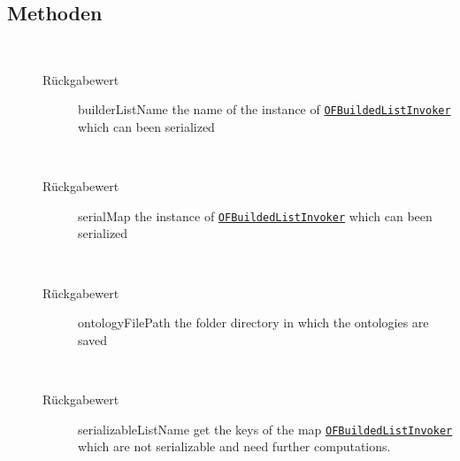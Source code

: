 \subsection{Methoden}
\begin{description}
\item[{\label{ontologyFramework.OFRunning.OFSystemState.getBuilderListName()}}]
~ 
\begin{description}
\item[Rückgabewert] 
builderListName the name of the instance of \texttt{\hyperlink{ontologyFramework.OFRunning.OFInvokingManager.OFBuildedListInvoker-class}{OFBuildedListInvoker}} which can been serialized
\end{description}
\item[{\label{ontologyFramework.OFRunning.OFSystemState.getSerialMap()}}]
~ 
\begin{description}
\item[Rückgabewert] 
serialMap the instance of \texttt{\hyperlink{ontologyFramework.OFRunning.OFInvokingManager.OFBuildedListInvoker-class}{OFBuildedListInvoker}} which can been serialized
\end{description}
\item[{\label{ontologyFramework.OFRunning.OFSystemState.getOntologyFilePath()}}]
~ 
\begin{description}
\item[Rückgabewert] 
ontologyFilePath the folder directory in which the ontologies are saved
\end{description}
\item[{\label{ontologyFramework.OFRunning.OFSystemState.getSerializableListName()}}]
~ 
\begin{description}
\item[Rückgabewert] 
serializableListName get the keys of the map \texttt{\hyperlink{ontologyFramework.OFRunning.OFInvokingManager.OFBuildedListInvoker-class}{OFBuildedListInvoker}} which are not serializable and need further computations.
\end{description}
\item[{\label{ontologyFramework.OFRunning.OFSystemState.setSerializableListName(java.util.Set<java.lang.String>)}}]

\end{description}
